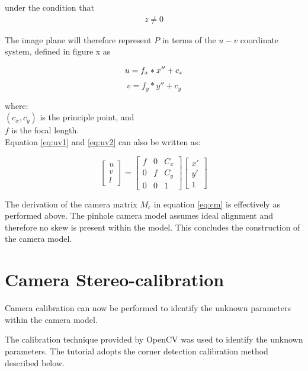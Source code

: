 under the condition that \begin{align*} z \neq 0 \end{align*}

The image plane will therefore represent $P$ in terms of the $u-v$ coordinate system, defined in figure x as 

\begin{equation}\label{eq:uv1}u = f_x*x'' + c_x \\ \end{equation}
\begin{equation}\label{eq:uv2}v = f_y*y'' + c_y \end{equation}

where:\\
$(c_x, c_y)$ is the principle point, and\\
$f$ is the focal length.\\

Equation \ref{eq:uv1} and \ref{eq:uv2} can also be written as:

\begin{equation}
\begin{bmatrix}u\\v\\l\end{bmatrix} =  
\begin{bmatrix}
f & 0 & C_x\\
0 & f & C_y\\
0 & 0 & 1
\end{bmatrix}
\begin{bmatrix}x'\\y'\\1\end{bmatrix}
\end{equation}

The derivation of the camera matrix $M_c$ in equation \ref{eq:cm} is effectively as performed above. The pinhole camera model assumes ideal alignment and therefore no skew is present within the model. This concludes the construction of the camera model.

\section{Camera Stereo-calibration}
\label{sec:cal_technique}

Camera calibration can now be performed to identify the unknown parameters within the camera model.

The calibration technique provided by OpenCV was used to identify the unknown parameters. The tutorial adopts the corner detection calibration method described below.\\

